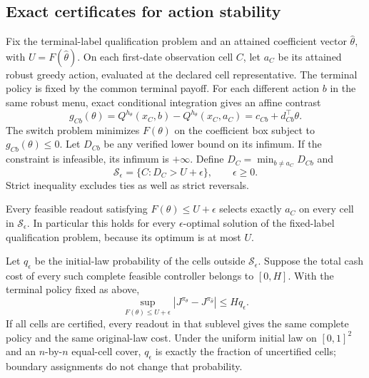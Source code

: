 \subsection{Exact certificates for action stability}
Fix the terminal-label qualification problem and an attained coefficient vector $\widehat\theta$, with $U=F(\widehat\theta)$. On each first-date observation cell $C$, let $a_C$ be its attained robust greedy action, evaluated at the declared cell representative. The terminal policy is fixed by the common terminal payoff. For each different action $b$ in the same robust menu, exact conditional integration gives an affine contrast
\[
 g_{Cb}(\theta)=Q^{h_\theta}(x_C,b)-Q^{h_\theta}(x_C,a_C)
                       =c_{Cb}+d_{Cb}^\top\theta.
\]
The switch problem minimizes $F(\theta)$ on the coefficient box subject to $g_{Cb}(\theta)\le0$. Let $D_{Cb}$ be any verified lower bound on its infimum. If the constraint is infeasible, its infimum is $+\infty$. Define $D_C=\min_{b\ne a_C}D_{Cb}$ and
\begin{equation}\label{eq:stable-cells81}
 \mathcal S_\epsilon=\{C:D_C>U+\epsilon\},\qquad \epsilon\ge0.
\end{equation}
Strict inequality excludes ties as well as strict reversals.

\begin{theorem}\label{thm:stability81}
Every feasible readout satisfying $F(\theta)\le U+\epsilon$ selects exactly $a_C$ on every cell in $\mathcal S_\epsilon$. In particular this holds for every $\epsilon$-optimal solution of the fixed-label qualification problem, because its optimum is at most $U$.

Let $q_\epsilon$ be the initial-law probability of the cells outside $\mathcal S_\epsilon$. Suppose the total cash cost of every such complete feasible controller belongs to $[0,H]$. With the terminal policy fixed as above,
\begin{equation}\label{eq:cost-stability81}
 \sup_{F(\theta)\le U+\epsilon}
       |J^{\pi_\theta}-J^{\pi_{\widehat\theta}}|
                       \le Hq_\epsilon.
\end{equation}
If all cells are certified, every readout in that sublevel gives the same complete policy and the same original-law cost. Under the uniform initial law on $[0,1]^2$ and an $n$-by-$n$ equal-cell cover, $q_\epsilon$ is exactly the fraction of uncertified cells; boundary assignments do not change that probability.
\end{theorem}

